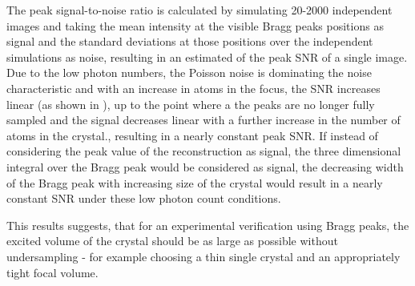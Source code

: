 The peak signal-to-noise ratio is calculated by simulating 20-2000 independent images  and taking the mean intensity at the visible Bragg peaks positions as signal and the standard deviations at those positions over the independent simulations as noise, resulting in an estimated of the peak SNR of a single image.
Due to the low photon numbers, the Poisson noise is dominating the noise characteristic and with an increase in atoms in the focus, the SNR increases linear (as shown in ), up to the point where a the peaks are no longer fully sampled and the signal decreases linear with a further increase in the number of atoms in the crystal., resulting in a nearly constant peak SNR.
If instead of considering the peak value of the reconstruction as signal, the three dimensional integral over the Bragg peak would be considered as signal, the decreasing width of the Bragg peak with increasing size of the crystal would result in a nearly constant SNR under these low photon count conditions. 

This results suggests, that for an experimental verification using Bragg peaks, the excited volume of the crystal should be as large as possible without undersampling - for example choosing a thin single crystal and an appropriately tight focal volume.


